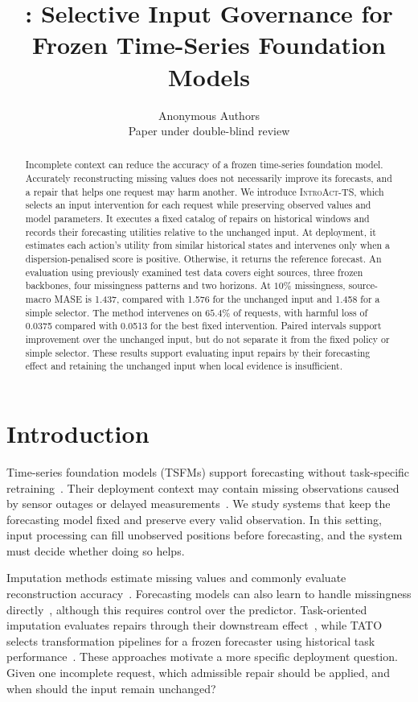 \documentclass{article}
\title{\introact{}: Selective Input Governance for \\
Frozen Time-Series Foundation Models}
\author{Anonymous Authors\\Paper under double-blind review}
\newcommand{\introact}{\textsc{IntroAct-TS}}
\newcommand{\tsfm}{TSFM}
\begin{document}
\maketitle

\begin{abstract}
Incomplete context can reduce the accuracy of a frozen time-series foundation model.
Accurately reconstructing missing values does not necessarily improve its forecasts, and a
repair that helps one request may harm another. We introduce \introact{}, which selects an
input intervention for each request while preserving observed values and model parameters.
It executes a fixed catalog of repairs on historical windows and records their forecasting
utilities relative to the unchanged input. At deployment, it estimates each action's utility
from similar historical states and intervenes only when a dispersion-penalised score is positive.
Otherwise, it returns the reference forecast. An evaluation using previously examined test
data covers eight sources, three frozen backbones, four missingness patterns and two horizons.
At $10\%$ missingness, source-macro MASE is 1.437, compared with 1.576 for the unchanged input
and 1.458 for a simple selector. The method intervenes on $65.4\%$ of requests, with harmful
loss of 0.0375 compared with 0.0513 for the best fixed intervention. Paired intervals support
improvement over the unchanged input, but do not separate it from the fixed policy or simple
selector. These results support evaluating input repairs by their forecasting effect and
retaining the unchanged input when local evidence is insufficient.

\end{abstract}

\section{Introduction}
\label{sec:intro}

Time-series foundation models (\tsfm{}s) support forecasting without task-specific
retraining~\citep{ansari2024chronos,chronosbolt2025,das2024timesfm,woo2024moirai,chronos2_2025}.
Their deployment context may contain missing observations caused by sensor outages or delayed
measurements~\citep{chen2024bitgraph,peng2025s4m}. We study systems that keep the forecasting
model fixed and preserve every valid observation. In this setting, input processing can fill
unobserved positions before forecasting, and the system must decide whether doing so helps.

Imputation methods estimate missing values and commonly evaluate reconstruction
accuracy~\citep{cao2018brits,tashiro2021csdi,du2023saits}. Forecasting models can also learn to
handle missingness directly~\citep{chen2024bitgraph,peng2025s4m}, although this requires control
over the predictor. Task-oriented imputation evaluates repairs through their downstream
effect~\citep{wang2024taskoriented,hao2025toivsf,xu2026srdi}, while TATO selects transformation
pipelines for a frozen forecaster using historical task performance~\citep{qiu2026tato}.
These approaches motivate a more specific deployment question. Given one incomplete request,
which admissible repair should be applied, and when should the input remain unchanged?
\end{document}
